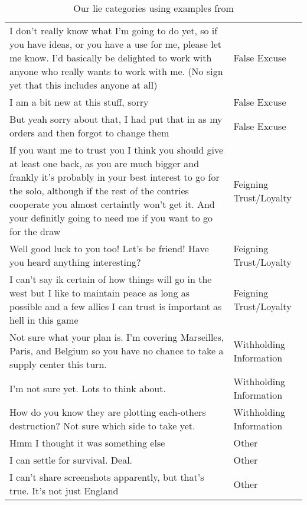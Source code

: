 \begin{table*}[t]
\begin{tabular}{p{11cm}p{4cm}}
{    I don’t really know what I’m going to do yet, so if you have ideas, or you have a use for me, please let me know. I’d basically be delighted to work with anyone who really wants to work with me. (No sign yet that this includes anyone at all)} & \small{False Excuse} \\ 
    \small{I am a bit new at this stuff, sorry} & \small{False Excuse} \\ 
    \rowcolor{grayish} \small{But yeah sorry about that, I had put that in as my orders and then forgot to change them} & \small{False Excuse} \\ 
    \small{If you want me to trust you I think you should give at least one back, as you are much bigger and frankly it's probably in your best interest to go for the solo, although if the rest of the contries cooperate you almost certaintly won't get it. And your definitly going to need me if you want to go for the draw} & \small{Feigning Trust/Loyalty} \\
    \rowcolor{grayish} \small{Well good luck to you too! Let's be friend! Have you heard anything interesting?} & \small{Feigning Trust/Loyalty}\\
    \small{I can't say ik certain of how things will go in the west but I like to maintain peace as long as possible and a few allies I can trust is important as hell in this game} & \small{Feigning Trust/Loyalty}\\
    \rowcolor{grayish} \small{Not sure what your plan is. I'm covering Marseilles, Paris, and Belgium so you have no chance to take a supply center this turn.} & \small{Withholding Information}\\
    \rowcolor{grayish} \small{I’m not sure yet. Lots to think about.} & \small{Withholding Information}\\
    \rowcolor{grayish} \small{How do you know they are plotting each-others destruction? Not sure which side to take yet.} & \small{Withholding Information}\\
    \small{Hmm I thought it was something else} & \small{Other}\\
    \rowcolor{grayish} \small{I can settle for survival. Deal.} & \small{Other}\\
    \small{I can't share screenshots apparently, but that's true.  It's not just England} & \small{Other}\\
    \end{tabular}
    \caption{Our lie categories using examples from \citet{peskov2020takes}}
    \label{tab:lie_category}
\end{table*}